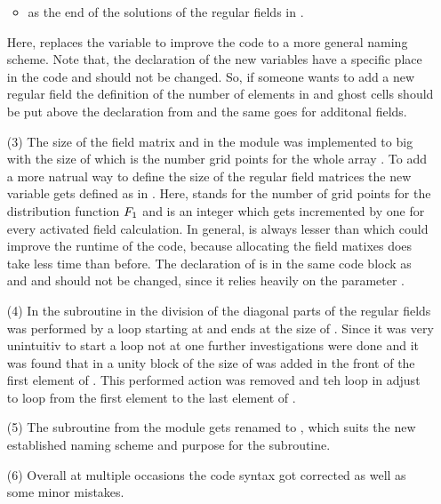 \begin{enumerate}
\begin{itemize}
        \item {} as the end of the solutions of the regular fields in .
    \end{itemize}
    Here,  replaces the variable  to improve the code to a more general naming scheme. Note that, the declaration of the new variables have a specific place in the code and should not be changed. So, if someone wants to add a new regular field the definition of the number of elements in  and ghost cells should be put above the declaration from  and  the same goes for additonal fields. 
    \newpage
    \item[(3)] The size of the field matrix  and  in the module  was implemented to big with the size of  which is the number grid points for the whole array . To add a more natrual way to define the size of the regular field matrices the new variable  gets defined as  in . Here,  stands for the number of grid points for the distribution function $F_1$ and  is an integer which gets incremented by one for every activated field calculation. In general,  is always lesser than  which could improve the runtime of the code, because allocating the field matixes does take less time than before. The declaration of  is in the same code block as  and  and should not be changed, since it relies heavily on the parameter .
    \item[(4)] In the subroutine  in  the division of the diagonal parts of the regular fields was performed by a loop starting at  and ends at the size of . Since it was very unintuitiv to start a loop not at one further investigations were done and it was found that in  a unity block of the size of  was added in the front of the first element of . This performed action was removed and teh loop in  adjust to loop from the first element to the last element of .
    \item[(5)] The subroutine  from the module  gets renamed to , which suits the new established naming scheme and purpose for the subroutine. %
    \item[(6)] Overall at multiple occasions the code syntax got corrected as well as some minor mistakes. 
\end{enumerate} 

\newpage